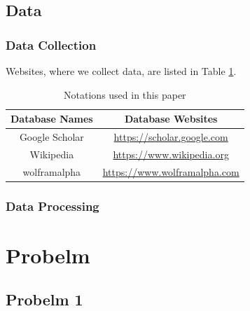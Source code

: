 \documentclass[12pt]{ctexart}
\begin{document}


\subsection{Data}
\subsubsection{Data Collection}
Websites, where we collect data, are listed in Table \ref{tb:data}.

\begin{table}[htbp]%
	\begin{center}
		\caption{Notations used in this paper}
		\begin{tabular}{c c}
			\toprule[1.5pt]
			\multicolumn{1}{m{5cm}}{\centering \textbf{Database Names}}
			               & \multicolumn{1}{m{10cm}}{\centering \textbf{Database Websites}}   \\
			\midrule
			Google Scholar & \href{https://scholar.google.com} {https://scholar.google.com}    \\
			Wikipedia      & \href{https://www.wikipedia.org}{https://www.wikipedia.org}       \\
			wolframalpha   & \href{https://www.wolframalpha.com}{https://www.wolframalpha.com} \\
			\bottomrule[1.5pt]
		\end{tabular}\label{tb:data}
	\end{center}
\end{table}
\vspace{-1cm}%

\subsubsection{Data Processing}

\section{Probelm}
\subsection{Probelm 1}
\end{document}
